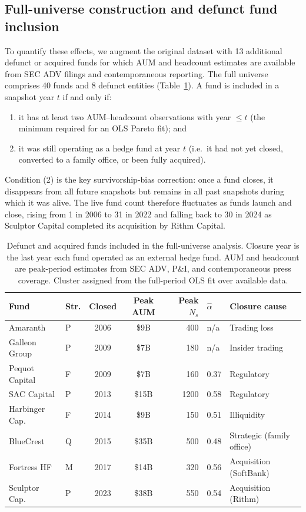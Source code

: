 \subsection{Full-universe construction and defunct fund inclusion}

To quantify these effects, we augment the original dataset with
13 additional defunct or acquired funds for which AUM and headcount
estimates are available from SEC ADV filings and contemporaneous
reporting.
The full universe comprises 40 funds and 8 defunct entities
(Table~\ref{tab:defunct}).
A fund is included in a snapshot year $t$ if and only if:
\begin{enumerate}\setlength\itemsep{1pt}
  \item it has at least two AUM--headcount observations with
        year $\le t$ (the minimum required for an OLS Pareto fit); and
  \item it was still operating as a hedge fund at year $t$
        (i.e.\ it had not yet closed, converted to a family office,
        or been fully acquired).
\end{enumerate}
Condition (2) is the key survivorship-bias correction: once a fund
closes, it disappears from all future snapshots but remains in all
past snapshots during which it was alive.
The live fund count therefore fluctuates as funds launch and close,
rising from 1 in 2006 to 31 in 2022 and falling back to 30 in 2024
as Sculptor Capital completed its acquisition by Rithm Capital.

\begin{table}[htbp]
\caption{\label{tab:defunct}
  Defunct and acquired funds included in the full-universe analysis.
  Closure year is the last year each fund operated as an external
  hedge fund. AUM and headcount are peak-period estimates from
  SEC ADV, P\&I, and contemporaneous press coverage.
  Cluster assigned from the full-period OLS fit over available data.
}
\setlength{\tabcolsep}{5pt}
\begin{tabular}{@{}llccrll@{}}
\toprule
Fund & Str. & Closed & Peak AUM & Peak $N_s$ & $\hat\alpha$ & Closure cause \\
\midrule
Amaranth        & P & 2006 & \$9B   & 400  & n/a  & Trading loss \\
Galleon Group   & P & 2009 & \$7B   & 180  & n/a  & Insider trading \\
Pequot Capital  & F & 2009 & \$7B   & 160  & 0.37 & Regulatory \\
SAC Capital     & P & 2013 & \$15B  & 1200 & 0.58 & Regulatory \\
Harbinger Cap.  & F & 2014 & \$9B   & 150  & 0.51 & Illiquidity \\
BlueCrest       & Q & 2015 & \$35B  & 500  & 0.48 & Strategic (family office) \\
Fortress HF     & M & 2017 & \$14B  & 320  & 0.56 & Acquisition (SoftBank) \\
Sculptor Cap.   & P & 2023 & \$38B  & 550  & 0.54 & Acquisition (Rithm) \\
\bottomrule
\end{tabular}
\end{table}

